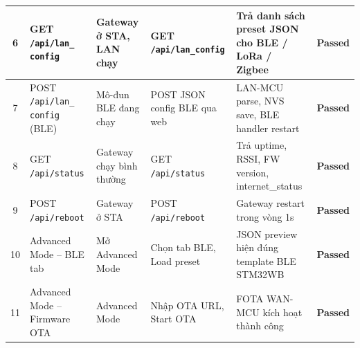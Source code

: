 \begin{longtable}{|c|p{}|p{}|p{}|p{}|c|}
            6 & GET \texttt{/api/lan\_} \newline \texttt{config} & Gateway ở STA, LAN chạy & GET \newline\texttt{/api/lan\_config} & Trả danh sách preset JSON cho BLE / LoRa / Zigbee & \textcolor{modern_blue}{\textbf{Passed}} \\ \hline
        
            7 & POST \texttt{/api/lan\_} \newline \texttt{config} (BLE) & Mô-đun BLE đang chạy & POST JSON config BLE qua web & LAN-MCU parse, NVS save, BLE handler restart & \textcolor{modern_blue}{\textbf{Passed}} \\ \hline
        
            8 & GET \texttt{/api/status} & Gateway chạy bình thường & GET \newline\texttt{/api/status} & Trả uptime, RSSI, FW version, internet\_status & \textcolor{modern_blue}{\textbf{Passed}} \\ \hline
        
            9 & POST \texttt{/api/reboot} & Gateway ở STA & POST \newline\texttt{/api/reboot} & Gateway restart trong vòng 1s & \textcolor{modern_blue}{\textbf{Passed}} \\ \hline
        
            10 & Advanced Mode -- BLE tab & Mở Advanced Mode & Chọn tab BLE, Load preset & JSON preview hiện đúng template BLE STM32WB & \textcolor{modern_blue}{\textbf{Passed}} \\ \hline
        
            11 & Advanced Mode -- Firmware OTA & Advanced Mode & Nhập OTA URL, Start OTA & FOTA WAN-MCU kích hoạt thành công & \textcolor{modern_blue}{\textbf{Passed}} \\ \hline
        \end{longtable}

